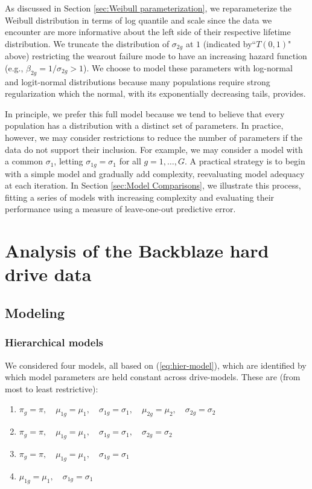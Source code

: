 \documentclass[12pt]{article}
\begin{document}
As discussed in Section \ref{sec:Weibull parameterization}, we reparameterize the Weibull distribution in terms of log quantile and scale since the data we encounter are more informative about the left side of their respective lifetime distribution. We truncate the distribution of $\sigma_{2g}$ at $1$ (indicated by``$T(0,1)$" above) restricting the wearout failure mode to have an increasing hazard function (e.g., $\beta_{2g} = 1/\sigma_{2g}>1$). We choose to model these parameters with log-normal and logit-normal distributions because many populations require strong regularization which the normal, with its exponentially decreasing tails, provides. 

In principle, we prefer this full model because we tend to believe that every population has a distribution with a distinct set of parameters. In practice, however, we may consider restrictions to reduce the number of parameters if the data do not support their inclusion. For example, we may consider a model with a common $\sigma_{1}$, letting $\sigma_{1g}=\sigma_1$ for all $g=1,\ldots,G$. A practical strategy is to begin with a simple model and gradually add complexity, reevaluating model adequacy at each iteration. In Section \ref{sec:Model Comparisons}, we illustrate this process, fitting a series of models with increasing complexity and evaluating their performance using a measure of leave-one-out predictive error.


\section{Analysis of the Backblaze hard drive data}
\label{sec:Data analysis}
\subsection{Modeling}
\subsubsection{Hierarchical models}
We considered four models, all based on (\ref{eq:hier-model}), which are identified by which model parameters are held constant across drive-models. These are (from most to least restrictive):

\begin{enumerate}
\item $\pi_{g} = \pi,\quad \mu_{1g} = \mu_1,\quad \sigma_{1g}=\sigma_1,\quad \mu_{2g} = \mu_2,\quad \sigma_{2g} = \sigma_2$
\item $\pi_{g} = \pi,\quad \mu_{1g} = \mu_1,\quad \sigma_{1g}=\sigma_1,\quad \sigma_{2g} = \sigma_2$
\item $\pi_{g} = \pi,\quad \mu_{1g} = \mu_1,\quad \sigma_{1g}=\sigma_1$
\item $\mu_{1g} = \mu_1,\quad \sigma_{1g}=\sigma_1$
\end{enumerate}
\end{document}
